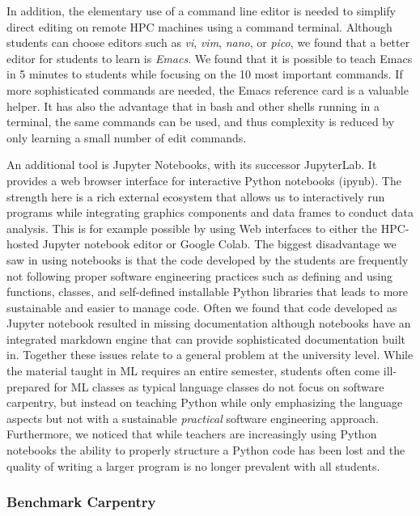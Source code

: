 \documentclass[utf8]{FrontiersinVancouver} %
\begin{document}
In addition, the elementary use of a command line editor is needed to
simplify direct editing on remote HPC machines using a command
terminal. Although students can choose editors such as {\em vi}, {\em
vim}, {\em nano}, or {\em pico}, we found that a better editor for
students to learn is {\em Emacs}. We found that it is possible to
teach Emacs in 5 minutes to students while focusing on the 10 most
important commands. If more sophisticated commands are needed, the
Emacs reference card is a valuable helper. It has also the advantage
that in bash and other shells running in a terminal, the same
commands can be used, and thus complexity is reduced by only
learning a small number of edit commands.

  An additional tool is Jupyter Notebooks, with its successor
  JupyterLab. It provides a web browser interface for interactive
  Python notebooks (ipynb). The strength here is a rich external
  ecosystem that allows us to interactively run programs while
  integrating graphics components and data frames to conduct data
  analysis.  This is for example possible by using Web interfaces to either the HPC-hosted Jupyter notebook editor or Google Colab.
  The biggest disadvantage we saw in using notebooks is
  that the code developed by the students are frequently not following proper
  software engineering practices such as defining and using functions,
  classes, and self-defined installable Python libraries that 
  leads to more sustainable and easier to manage code. Often we found that code
  developed as Jupyter notebook resulted in missing
  documentation although notebooks have an integrated markdown engine that can provide sophisticated documentation built in. Together these issues relate to a general problem at the
  university level. While the material taught in ML requires an entire
  semester, students often come ill-prepared for ML classes as typical
  language classes do not focus on software carpentry, but instead on
  teaching Python while only emphasizing the language aspects but not
  with a sustainable {\em practical} software engineering
  approach. Furthermore, we noticed that while teachers are
  increasingly using Python notebooks the ability to properly
  structure a Python code has been lost and the quality of writing a
  larger program is no longer prevalent with all students.

\subsubsection{Benchmark Carpentry}
\end{document}
